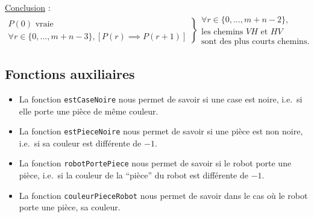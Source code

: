 \documentclass[12pt,a4paper]{article}
\begin{document}
\underline{Conclusion} : 
\begin{equation*}
  \left .\begin{array}{l}
	P(0) \text{ vraie } \\
	\forall r \in \{0,\dotsc, m+n-3\}, [ P(r) \implies P(r+1) 
	]
  \end{array} \right \}
  \left .\begin{array}{l}
	\forall r \in \{0,\dotsc, m+n-2\}, \\
	\text{les chemins } VH \text{ et } HV\\
	\text{sont des plus courts chemins.}
  \end{array}\right .
\end{equation*}

\subsection*{Fonctions auxiliaires}
\begin{itemize}
  \item La fonction \texttt{estCaseNoire} nous permet de savoir si une case est 
noire, i.e.\ si elle porte une pi\`ece de m\^eme couleur.
  \item La fonction \texttt{estPieceNoire} nous permet de savoir si une pi\`ece 
est non noire, i.e.\ si sa couleur est diff\'erente de $-1$.
  \item La fonction \texttt{robotPortePiece} nous permet de savoir si le robot 
porte une pi\`ece, i.e.\ si la couleur de la ``pi\`ece'' du robot est 
diff\'erente de $-1$.
  \item La fonction \texttt{couleurPieceRobot} nous permet de savoir dans le 
cas o\`u le robot porte une pi\`ece, sa couleur.
\end{itemize}
\end{document}
